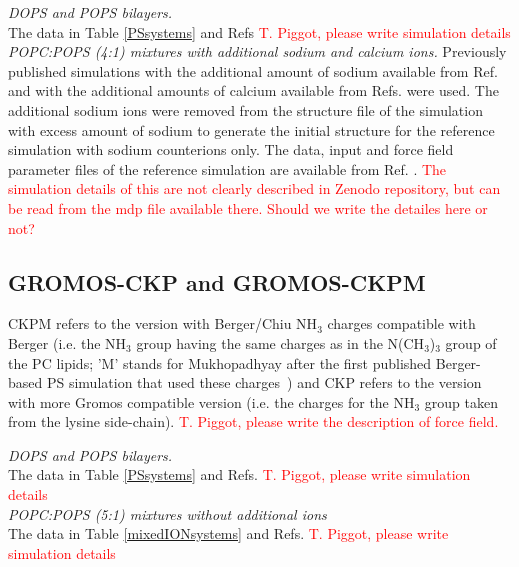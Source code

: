 \documentclass[journal=jpcbfk]{achemso}
\newcommand{\todo}[1]{\textcolor{red}{#1}}
\begin{document}
\noindent
{\it DOPS and POPS bilayers.} \\
The data in Table \ref{PSsystems} and Refs 
\todo{T. Piggot, please write simulation details} \\

\noindent
{\it POPC:POPS (4:1) mixtures with additional sodium and calcium ions.} 
Previously published simulations with the additional amount of sodium \cite{jurkiewicz12}
available from Ref.  and with the additional amounts
of calcium \cite{melcrova16} available from Refs. 
were used. The additional sodium ions were removed from the structure file of the simulation
with excess amount of sodium \cite{POPCpopsBERGERwith1000mMNa} to generate the initial structure for the reference simulation
with sodium counterions only. The data, input and force field parameter files of the reference simulation
are available from Ref. . \todo{The simulation details of this are
  not clearly described in Zenodo repository, but can be read from the mdp file available there. Should we
write the detailes here or not?}


\subsection{GROMOS-CKP and GROMOS-CKPM}
  CKPM refers to the version with Berger/Chiu NH$_3$ charges compatible with Berger
   (i.e. the NH$_3$ group having the same charges as in the N(CH$_3$)$_3$ group of the PC lipids;
   'M' stands for Mukhopadhyay after the first published Berger-based PS simulation that used these charges~\cite{mukhopadhyay04})
   and CKP refers to the version with more Gromos compatible version
   (i.e. the charges for the NH$_3$ group taken from the lysine side-chain).
\todo{T. Piggot, please write the description of force field.}

\noindent
{\it DOPS and POPS bilayers.} \\
The data in Table \ref{PSsystems} and Refs. 
\todo{T. Piggot, please write simulation details} \\

\noindent
    {\it POPC:POPS (5:1) mixtures without additional ions}\\
    The data in Table \ref{mixedIONsystems} and Refs. 
\todo{T. Piggot, please write simulation details} \\
\end{document}
